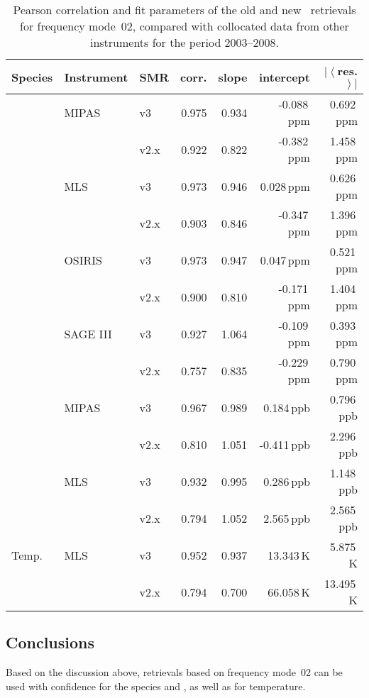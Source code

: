 \begin{table}[hbt]
\centering
\caption{Pearson correlation and fit parameters of the old and new \smr\
retrievals for frequency mode~02, compared with collocated data from other
instruments for the period 2003--2008.
}
\label{tab:fm02:stats}
\begin{tabular}{lllrrrr}
    \toprule
    \textbf{Species} & \textbf{Instrument} & \textbf{SMR} & \textbf{corr.} & \textbf{slope} & \textbf{intercept} & \textbf{$\left|\left<\right.\right.$res.$\left.\left.\right>\right|$} \\
    \midrule
    \chem{O3}       & MIPAS     & v3    & 0.975 & 0.934 & -0.088\,ppm   & 0.692\,ppm \\
                    &           & v2.x  & 0.922 & 0.822 & -0.382\,ppm   & 1.458\,ppm \\
    \cline{2-7}
                    & MLS       & v3    & 0.973 & 0.946 & 0.028\,ppm    & 0.626\,ppm \\
                    &           & v2.x  & 0.903 & 0.846 & -0.347\,ppm   & 1.396\,ppm \\
    \cline{2-7}
                    & OSIRIS    & v3    & 0.973 & 0.947 & 0.047\,ppm    & 0.521\,ppm \\
                    &           & v2.x  & 0.900 & 0.810 & -0.171\,ppm   & 1.404\,ppm \\
    \cline{2-7}
                    & SAGE III  & v3    & 0.927 & 1.064 & -0.109\,ppm   & 0.393\,ppm \\
                    &           & v2.x  & 0.757 & 0.835 & -0.229\,ppm   & 0.790\,ppm \\
    \midrule
    \chem{HNO_3}    & MIPAS     & v3    & 0.967 & 0.989 & 0.184\,ppb    & 0.796\,ppb \\
                    &           & v2.x  & 0.810 & 1.051 & -0.411\,ppb    & 2.296\,ppb \\
    \cline{2-7}
                    & MLS       & v3    & 0.932 & 0.995 & 0.286\,ppb    & 1.148\,ppb \\
                    &           & v2.x  & 0.794 & 1.052 & 2.565\,ppb    & 2.565\,ppb \\
    \midrule
    Temp.           & MLS       & v3    & 0.952 & 0.937 & 13.343\,K     &  5.875\,K \\
                    &           & v2.x  & 0.794 & 0.700 & 66.058\,K     & 13.495\,K \\
    \bottomrule
\end{tabular}
\end{table}

\subsection{Conclusions}
\label{sec:fm02:conclusions}
Based on the discussion above, retrievals based on frequency mode~02 can be
used with confidence for the species \chem{O_3} and \chem{HNO_3}, as well as
for temperature.

